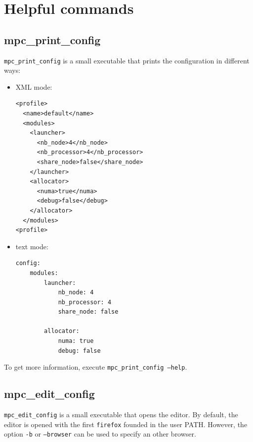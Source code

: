 \documentclass{article}
\begin{document}
\newpage

\section{Helpful commands}

\subsection{mpc\_print\_config}

\texttt{mpc\_print\_config} is a small executable that prints the configuration in different ways:
\begin{itemize}
\item XML mode:
\lstset{language=XML}
\begin{lstlisting}
<profile>
  <name>default</name>
  <modules>
    <launcher>
      <nb_node>4</nb_node>
      <nb_processor>4</nb_processor>
      <share_node>false</share_node>
    </launcher>
    <allocator>
      <numa>true</numa>
      <debug>false</debug>
    </allocator>
  </modules>
<profile>
\end{lstlisting}
\item text mode:
\lstset{language=bash}
\begin{lstlisting}
config:
    modules:
        launcher:
            nb_node: 4
            nb_processor: 4
            share_node: false

        allocator:
            numa: true
            debug: false
\end{lstlisting}
\end{itemize}

\noindent To get more information, execute \texttt{mpc\_print\_config --help}.

\subsection{mpc\_edit\_config}

\texttt{mpc\_edit\_config} is a small executable that opens the editor. By default, the editor is opened with the first \texttt{firefox} founded in the user PATH. However, the option \texttt{-b} or \texttt{--browser} can be used to specify an other browser.
\end{document}
